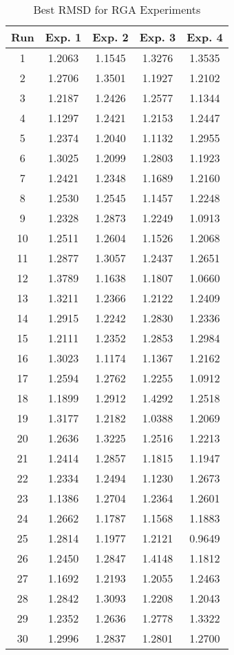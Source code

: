 \begin{table}
	\centering
	\begin{tabular}{ | c | c | c | c | c | }
		\hline
		Run & Exp. 1 & Exp. 2 & Exp. 3 & Exp. 4 \\ \hline
		1 & 1.2063 & 1.1545 & 1.3276 & 1.3535 \\ \hline
		2 & 1.2706 & 1.3501 & 1.1927 & 1.2102 \\ \hline
		3 & 1.2187 & 1.2426 & 1.2577 & 1.1344 \\ \hline
		4 & 1.1297 & 1.2421 & 1.2153 & 1.2447 \\ \hline
		5 & 1.2374 & 1.2040 & 1.1132 & 1.2955 \\ \hline
		6 & 1.3025 & 1.2099 & 1.2803 & 1.1923 \\ \hline
		7 & 1.2421 & 1.2348 & 1.1689 & 1.2160 \\ \hline
		8 & 1.2530 & 1.2545 & 1.1457 & 1.2248 \\ \hline
		9 & 1.2328 & 1.2873 & 1.2249 & 1.0913 \\ \hline
		10 & 1.2511 & 1.2604 & 1.1526 & 1.2068 \\ \hline
		11 & 1.2877 & 1.3057 & 1.2437 & 1.2651 \\ \hline
		12 & 1.3789 & 1.1638 & 1.1807 & 1.0660 \\ \hline
		13 & 1.3211 & 1.2366 & 1.2122 & 1.2409 \\ \hline
		14 & 1.2915 & 1.2242 & 1.2830 & 1.2336 \\ \hline
		15 & 1.2111 & 1.2352 & 1.2853 & 1.2984 \\ \hline
		16 & 1.3023 & 1.1174 & 1.1367 & 1.2162 \\ \hline
		17 & 1.2594 & 1.2762 & 1.2255 & 1.0912 \\ \hline
		18 & 1.1899 & 1.2912 & 1.4292 & 1.2518 \\ \hline
		19 & 1.3177 & 1.2182 & 1.0388 & 1.2069 \\ \hline
		20 & 1.2636 & 1.3225 & 1.2516 & 1.2213 \\ \hline
		21 & 1.2414 & 1.2857 & 1.1815 & 1.1947 \\ \hline
		22 & 1.2334 & 1.2494 & 1.1230 & 1.2673 \\ \hline
		23 & 1.1386 & 1.2704 & 1.2364 & 1.2601 \\ \hline
		24 & 1.2662 & 1.1787 & 1.1568 & 1.1883 \\ \hline
		25 & 1.2814 & 1.1977 & 1.2121 & 0.9649 \\ \hline
		26 & 1.2450 & 1.2847 & 1.4148 & 1.1812 \\ \hline
		27 & 1.1692 & 1.2193 & 1.2055 & 1.2463 \\ \hline
		28 & 1.2842 & 1.3093 & 1.2208 & 1.2043 \\ \hline
		29 & 1.2352 & 1.2636 & 1.2778 & 1.3322 \\ \hline
		30 & 1.2996 & 1.2837 & 1.2801 & 1.2700 \\ \hline
	\end{tabular}
	\caption{Best RMSD for RGA Experiments}
\end{table}

